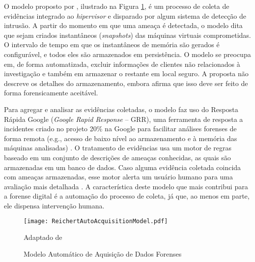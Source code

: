 O modelo proposto por \cite{ReichertAutoAcquisition:2015}, ilustrado na Figura \ref{fig:ReichertAutoAcquisitionModel}, é um processo de coleta de evidências integrado ao \textit{hipervisor} e disparado por algum sistema de detecção de intrusão. 
%
A partir do momento em que uma ameaça é detectada, o modelo dita que sejam criados instantâneos (\textit{snapshots}) das máquinas virtuais comprometidas. 
%
O intervalo de tempo em que os instantâneos de memória são gerados é configurável, e todos eles são armazenados em persistência.
%
O modelo se preocupa em, de forma automatizada, excluir informações de clientes não relacionados à investigação e também em armazenar o restante em local seguro.
%
A proposta não descreve os detalhes do armazenamento, embora afirma que isso deve ser feito de forma forensicamente aceitável.


Para agregar e analisar as evidências coletadas, o modelo faz uso do Resposta Rápida Google (\textit{Google Rapid Response} -- GRR), uma ferramenta de resposta a incidentes criado no projeto 20\% na Google para facilitar análises forenses de forma remota (e.g., acesso de baixo nível ao armazenamento e à memória das máquinas analisadas) \cite{GRRRapidResponse:2013}.
%
O tratamento de evidências usa um motor de regras baseado em um conjunto de descrições de ameaças conhecidas, as quais são armazenadas em um banco de dados.
%
Caso alguma evidência coletada coincida com ameaças armazenadas, esse motor alerta um usuário humano para uma avaliação mais detalhada \cite{ReichertAutoAcquisition:2015}.
%
A característica deste modelo que mais contribui para a forense digital é a automação do processo de coleta, já que, ao menos em parte, ele dispensa intervenção humana. 


%
%

\begin{figure}[htb!]
\footnotesize
\caption{Modelo Automático de Aquisição de Dados Forenses} %
\texttt{[image: ReichertAutoAcquisitionModel.pdf]}
\centering
\label{fig:ReichertAutoAcquisitionModel}
\begin{center}
Adaptado de \cite{ReichertAutoAcquisition:2015} 
\end{center}
\end{figure}


